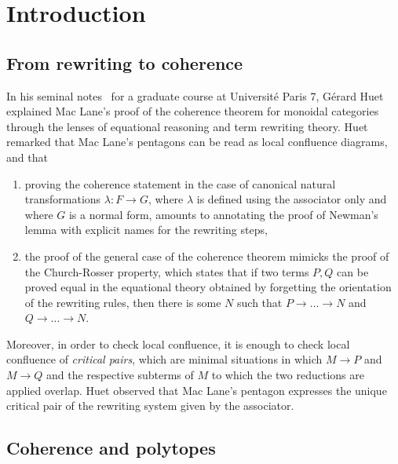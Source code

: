 
\section*{Introduction} 
\label{s:introduction}



\subsection*{From rewriting to coherence}

In his seminal notes~\cite{Huet-notes-cat} for a graduate course at Université Paris 7, Gérard Huet explained Mac Lane's proof of the coherence theorem for monoidal categories through the lenses of equational reasoning and  term rewriting theory. 
Huet remarked that Mac Lane's pentagons can be read as local confluence diagrams, and that
\begin{enumerate}
\item proving  the coherence statement in the case of canonical natural transformations $\lambda:F\rightarrow G$, where $\lambda$ is defined using the associator only and where $G$ is a normal form, amounts to annotating the proof of Newman's lemma with  explicit names for the rewriting steps, 
\item the proof of the general case of the coherence theorem mimicks the proof of the Church-Rosser property, which states that if two terms $P,Q$ can be proved equal in the equational theory obtained by forgetting the orientation of the rewriting rules, then there is some $N$ such that $P\rightarrow\ldots\rightarrow N$ and
$Q\rightarrow\ldots\rightarrow N$.
\end{enumerate}
Moreover, in order to check local confluence, it is enough to check local confluence of {\em critical pairs}, which are minimal situations in which $M\rightarrow P$ and $M\rightarrow Q$ and the respective subterms of $M$ to which the two reductions are applied overlap. Huet observed that Mac Lane's pentagon expresses the unique critical pair of  the rewriting system given by the associator.

\subsection*{Coherence and polytopes}

